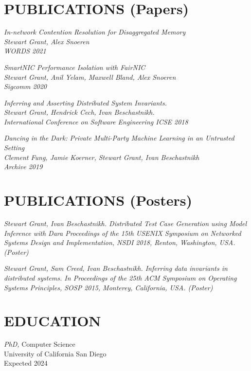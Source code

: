 \documentclass[line,margin]{res}
\begin{document}
\address{https://www.stewartgrant.ca}
\address{ssgrant@eng.ucsd.edu}
\begin{resume}

    \section{PUBLICATIONS (Papers)}

{\sl 
    In-network Contention Resolution for Disaggregated Memory \\
    Stewart Grant, Alex Snoeren\\
    WORDS 2021 \\
    }

{\sl 
    SmartNIC Performance Isolation with FairNIC \\
    Stewart Grant, Anil Yelam, Maxwell Bland, Alex Snoeren\\
    Sigcomm 2020 \\
    }

{\sl 
    Inferring and Asserting Distributed System Invariants. \\
    Stewart Grant, Hendrick Cech, Ivan Beschastnikh. \\
    International Conference on Software Engineering ICSE 2018 \\
    }

{\sl 
    Dancing in the Dark: Private Multi-Party Machine Learning in an Untrusted Setting \\
    Clement Fung, Jamie Koerner, Stewart Grant, Ivan Beschastnikh \\
    Archive 2019
    }

\section{PUBLICATIONS (Posters)}

{\sl Stewart Grant, Ivan Beschastnikh. 
    Distributed Test Case Generation using Model Inference with Dara
    \it{Proceedings of the 15th
    USENIX Symposium on Networked Systems Design and Implementation, NSDI 2018},
    Renton, Washington, USA. (Poster)}

{\sl Stewart Grant, Sam Creed, Ivan Beschastnikh. Inferring data
    invariants in distributed systems. In \it{Proceedings of the 25th
    ACM Symposium on Operating Systems Principles, SOSP 2015},
    Monterey, California, USA. (Poster)}

\section{EDUCATION}
{\sl PhD,} Computer Science \\
University of California San Diego \\
Expected 2024 \\


\end{resume}
\end{document}
